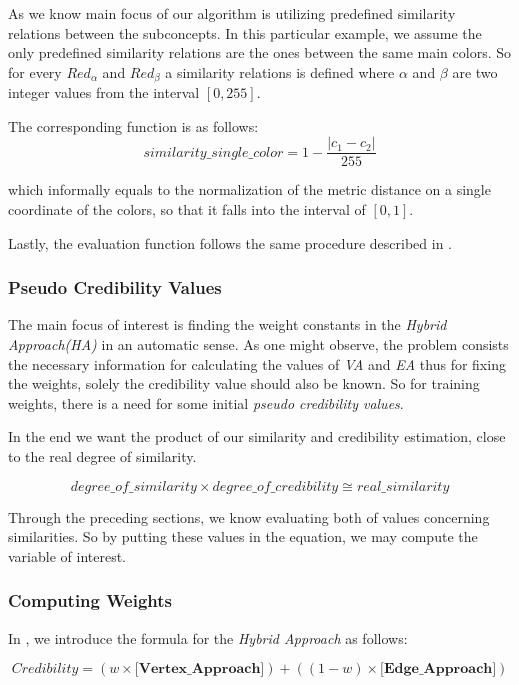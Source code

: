 \documentclass[egilmezThesis.tex]{subfiles}
\begin{document}
As we know main focus of our algorithm is utilizing predefined similarity relations between the subconcepts. In this particular example, we assume the only predefined similarity relations are the ones between the same  main colors. So for every $Red_\alpha$ and $Red_\beta$ a similarity relations is defined where $\alpha$ and $\beta$ are two integer values from the interval $[0, 255]$. 

The corresponding function is as follows:
$$similarity\_single\_color = 1 - \frac{|c_1-c_2|}{255}$$
  
which informally equals to the normalization of the metric distance on a single coordinate of the colors, so that it falls  into the interval of $[0,1]$.

Lastly, the evaluation function follows the same procedure described in \cite{Sin12} .



\subsubsection{Pseudo Credibility Values}
\label{pcv}

The main focus of interest is finding the weight constants in the \textit{Hybrid Approach(HA)} in an automatic sense. As one might observe, the problem consists the necessary information for calculating the values of \textit{VA} and \textit{EA} thus for fixing the weights, solely the credibility value should also be known. So for training weights, there is a need for some initial \textit{pseudo credibility values}.

In the end we want the product of our similarity and credibility estimation, close to the real degree of similarity.

$$  degree\_of\_similarity \times degree\_of\_credibility \cong real\_similarity $$

Through the preceding sections, we know evaluating both of values concerning similarities. So by putting these values in the equation, we may compute the variable of interest.


\subsubsection{Computing Weights}
\label{weights}

In \cite{Sin12} , we introduce the formula for the \textit{Hybrid Approach} as follows:

\begin{equation}
\textit{Credibility} = (w \times  \textbf{[Vertex\_Approach]}) + ((1-w) \times  \textbf{[Edge\_Approach]})
\end{equation}
\end{document}
